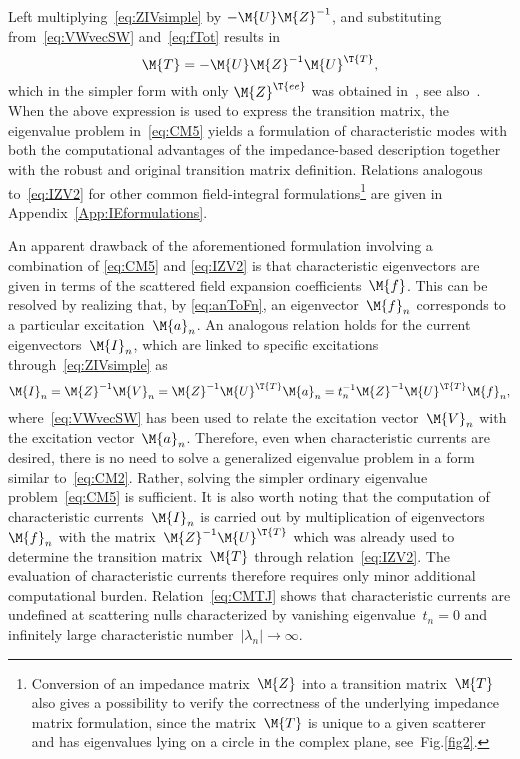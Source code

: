 \documentclass[journal]{IEEEtran}
\providecommand{\Umat}{\M{U}} %
\begin{document}
Left multiplying~\eqref{eq:ZIVsimple} by $-\Umat\M{Z}^{-1}$,  and substituting from~\eqref{eq:VWvecSW} and~\eqref{eq:fTot} results in
\begin{equation}
\label{eq:IZV2}
\M{T} = - \Umat
\M{Z}^{-1} 
\Umat^\T{T},
\end{equation}
which in the simpler form with only $\M{Z}^{\T{ee}}$ was obtained in~\cite{1991_Gurel_APS,2013_Kim_TAP,2017_Markkanen_JQSRT,Losenicky_etal_MoMandThybrid}, see also~\cite{Nieminen+etal2003,Reid2000}. When the above expression is used to express the transition matrix, the eigenvalue problem in~\eqref{eq:CM5} yields a formulation of characteristic modes with both the computational advantages of the impedance-based  description together with the robust and original transition matrix definition. Relations analogous to~\eqref{eq:IZV2} for other common field-integral formulations\footnote{Conversion of an impedance matrix~$\M{Z}$ into a transition matrix~$\M{T}$ also gives a possibility to verify the correctness of the underlying impedance matrix formulation, since the matrix~$\M{T}$ is unique to a given scatterer and has eigenvalues lying on a circle in the complex plane, see~Fig.\ref{fig2}.} are given in Appendix~\ref{App:IEformulations}.

An apparent drawback of the aforementioned formulation involving a combination of \eqref{eq:CM5} and \eqref{eq:IZV2} is that characteristic eigenvectors are given in terms of the scattered field expansion coefficients~$\M{f}$. This can be resolved by realizing that, by \eqref{eq:anToFn}, an eigenvector~$\M{f}_n$ corresponds to a particular excitation~$\M{a}_n$.
An analogous relation holds for the current eigenvectors~$\M{I}_n$, which are linked to specific excitations through~\eqref{eq:ZIVsimple} as
\begin{equation}
    \M{I}_n=\M{Z}^{-1}\M{V}_n
    =\M{Z}^{-1}\M{U}^{\T{T}}\M{a}_n
    =t_n^{-1}\M{Z}^{-1}\M{U}^{\T{T}}\M{f}_n,
    \label{eq:CMTJ}
\end{equation}
where~\eqref{eq:VWvecSW} has been used to relate the excitation vector~$\M{V}_n$ with the excitation vector~$\M{a}_n$. Therefore, even when characteristic currents are desired, there is no need to solve a generalized eigenvalue problem in a form similar to~\eqref{eq:CM2}. Rather, solving the simpler ordinary eigenvalue problem~\eqref{eq:CM5} is sufficient. It is also worth noting that the computation of characteristic currents~$\M{I}_n$ is carried out by multiplication of eigenvectors~$\M{f}_n$ with the matrix~$\M{Z}^{-1}\M{U}^{\T{T}}$ which was already used to determine the transition matrix~$\M{T}$ through relation~\eqref{eq:IZV2}. The evaluation of characteristic currents therefore requires only minor additional computational burden.  Relation~\eqref{eq:CMTJ} shows that characteristic currents are undefined at scattering nulls characterized by vanishing eigenvalue~$t_n = 0$ and infinitely large characteristic number~$\left| \lambda_n \right| \to \infty$.
\end{document}
